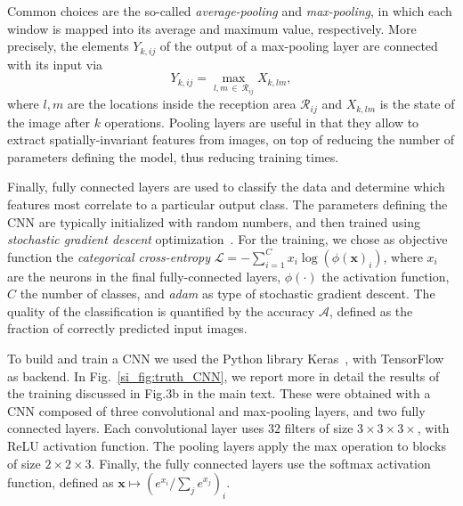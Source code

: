 \documentclass[
    floatfix, aps, pra, superscriptaddress,
	10pt, twocolumn,
    nofootinbib,
	tightenlines
]{revtex4-1}
\begin{document}
Common choices are the so-called \textit{average-pooling} and \textit{max-pooling}, in which each window is mapped into its average and maximum value, respectively.
More precisely, the elements $Y_{k,ij}$ of the output of a max-pooling layer are connected with its input via
\begin{equation}
    Y_{k,ij} =  \max_{l,m \,\in \,\mathcal{R}_{ij}} X_{k,lm},
    \label{eq:ml_pool}
\end{equation}
where $l,m$ are the locations inside the reception area $\mathcal{R}_{ij}$ and $X_{k,lm}$ is the state of the image after $k$ operations.
Pooling layers are useful in that they allow to extract spatially-invariant features from images, on top of reducing the number of parameters defining the model, thus reducing training times.

Finally, fully connected layers are used to classify the data and determine which features most correlate to a particular output class.
The parameters defining the CNN are typically initialized with random numbers, and then trained using \textit{stochastic gradient descent} optimization~\cite{ruder2016overview}.
For the training, we chose as objective function the \textit{categorical cross-entropy}
$\mathcal{L}=- \sum_{i=1}^{C} x_i\log(\phi(\textbf{x})_i)$, where $x_i$ are the neurons in the final fully-connected layers, $\phi(\cdot)$ the activation function, $C$ the number of classes, and \textit{adam} as type of stochastic gradient descent.
The quality of the classification is quantified by the accuracy $\mathcal A$, defined as the fraction of correctly predicted input images.

To build and train a {CNN} we used the Python library Keras~\cite{chollet2015keras}, with TensorFlow~\cite{tensorflow2015-whitepaper} as backend.
In Fig.~\ref{si_fig:truth_CNN}, we report more in detail the results of the training discussed in Fig.3b in the main text. These were obtained with a CNN composed of three convolutional and max-pooling layers, and two fully connected layers. Each convolutional layer uses $32$ filters of size $3\times3\times3\times$, with ReLU activation function. The pooling layers apply the max operation to blocks of size $2\times2\times3$. Finally, the fully connected layers use the softmax activation function, defined as $\boldsymbol x\mapsto (e^{x_i}/\sum_j e^{x_j})_i$.
\end{document}
